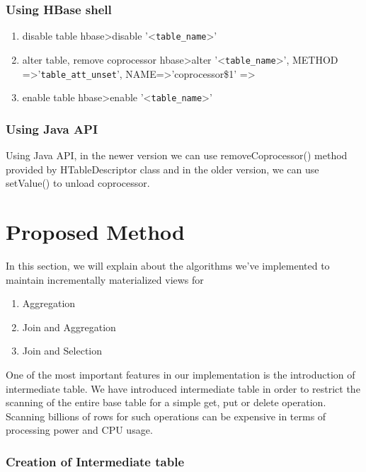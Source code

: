 \documentclass[11pt,a4paper,bibtotoc,idxtotoc,headsepline,footsepline,footexclude,BCOR12mm,DIV13]{scrbook}
\begin{document}
\subsubsection{Using HBase shell}
\begin{enumerate}
    \item disable table
    hbase\textgreater disable '\textless \texttt{table\_name}\textgreater'
    \item alter table, remove coprocessor
    hbase\textgreater alter '\textless \texttt{table\_name}\textgreater', \newline
    METHOD =\textgreater '\texttt{table\_att\_unset}', NAME=\textgreater 'coprocessor\$1' =\textgreater
    \item enable table
    hbase\textgreater enable '\textless \texttt{table\_name}\textgreater'
     
\end{enumerate}

\subsubsection{Using Java API}
Using Java API, in the newer version we can use removeCoprocessor() method provided by HTableDescriptor class and in the older version, we can use setValue() to unload coprocessor.

\section{Proposed Method}
In this section, we will explain about the algorithms we've implemented to maintain incrementally materialized views for 
\begin{enumerate}
    \item Aggregation
    \item Join and Aggregation
    \item Join and Selection
\end{enumerate}

One of the most important features in our implementation is the introduction of intermediate table. We have introduced intermediate table in order to restrict the scanning of the entire base table for a simple get, put or delete operation. Scanning billions of rows for such operations can be expensive in terms of processing power and CPU usage. 

\subsubsection{Creation of Intermediate table}
\label{subsec:intermediatetable}
\end{document}

